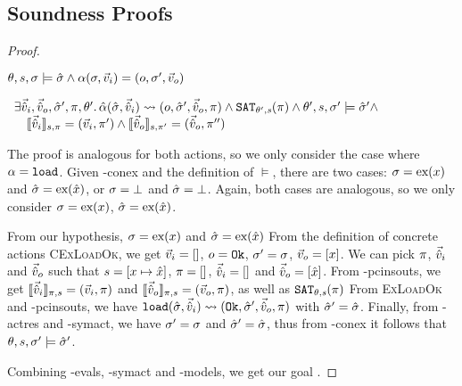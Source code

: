 \subsection{Soundness Proofs}

\begin{proof}


\pfassume \begin{hypvlist}
 $\theta,s,\st\models\sst \land \ppexecc{\alpha}{\st,\ins}{o,\st',\outs}$
\end{hypvlist}
\pfprove \begin{goalvlist}
 $
\begin{array}{l}
\exists \sins,\souts,\sst',\pc,\theta'\ldotp \ppexec{\hat\alpha}{\sst,\sins}{o,\sst',\souts,\pc} \land \SAT[\theta',s](\pc) \land \theta',s,\st'\models \sst' \land\\
\quad \expeval[s,\pc]{\sins}=(\ins,\pc')\land\expeval[s,\pc']{\souts}=(\souts,\pc'')
\end{array}
$
\end{goalvlist}

The proof is analogous for both actions, so we only consider the case where $\alpha=\load$. Given \hyp{conex} and the definition of $\models$, there are two cases: $\st=\ex{x}$ and $\sst=\ex{\sym x}$, or $\st=\bot$ and $\sst=\bot$. Again, both cases are analogous, so we only consider $\st=\ex{x}$, $\sst=\ex{\sym x}$.

\begin{hypvlist}
 From our hypothesis, $\st=\ex{x}$ and $\sst=\ex{\sym x}$
 From the definition of concrete actions \textsc{CExLoadOk}, we get $\ins=[]$, $o=\Ok$, $\st'=\st$, $\outs=[x]$.
 We can pick $\pc$, $\sins$ and $\souts$ such that $s=[x\mapsto \sym x]$, $\pc = []$, $\sins=[]$ and $\souts=[\sym x]$.
 From \hyp{pcinsouts}, we get $\expeval[\pc,s]{\sins}=(\ins,\pc)$ and $\expeval[\pc,s]{\souts}=(\outs,\pc)$, as well as $\SAT(\pc)$
 From \textsc{ExLoadOk} and \hyp{pcinsouts}, we have $\ppexec{\load}{\sst,\sins}{\Ok, \sst', \souts, \pc}$ with $\sst'=\sst$.
 Finally, from \hyp{actres} and \hyp{symact}, we have $\st'=\st$ and $\sst'=\sst$, thus from \hyp{conex} it follows that $\theta,s,\st'\models\sst'$.
\end{hypvlist}
Combining \hyp{evals}, \hyp{symact} and \hyp{models}, we get our goal .



\end{proof}
